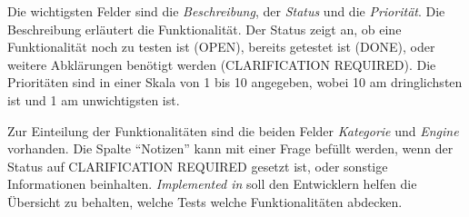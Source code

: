 Die wichtigsten Felder sind die \textit{Beschreibung}, der \textit{Status} und die \textit{Priorität}. Die Beschreibung erläutert die Funktionalität. Der Status zeigt an, ob eine Funktionalität noch zu testen ist (OPEN), bereits getestet ist (DONE), oder weitere Abklärungen benötigt werden (CLARIFICATION REQUIRED). Die Prioritäten sind in einer Skala von 1 bis 10 angegeben, wobei 10 am dringlichsten ist und 1 am unwichtigsten ist.

Zur Einteilung der Funktionalitäten sind die beiden Felder \textit{Kategorie} und \textit{Engine} vorhanden. Die Spalte "`Notizen"' kann mit einer Frage befüllt werden, wenn der Status auf CLARIFICATION REQUIRED gesetzt ist, oder sonstige Informationen beinhalten. \textit{Implemented in} soll den Entwicklern helfen die Übersicht zu behalten, welche Tests welche Funktionalitäten abdecken.
















